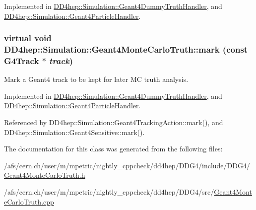 Implemented in \hyperlink{class_d_d4hep_1_1_simulation_1_1_geant4_dummy_truth_handler_aa5a1b21c7557cd4dfb314b217fc37a87}{DD4hep::Simulation::Geant4DummyTruthHandler}, and \hyperlink{class_d_d4hep_1_1_simulation_1_1_geant4_particle_handler_a3ad0a4c70220326e76da4dd79c95501c}{DD4hep::Simulation::Geant4ParticleHandler}.\hypertarget{class_d_d4hep_1_1_simulation_1_1_geant4_monte_carlo_truth_ad74253c38fb6e00003b591a07e5e748d}{
\subsubsection[{mark}]{\setlength{\rightskip}{0pt plus 5cm}virtual void DD4hep::Simulation::Geant4MonteCarloTruth::mark (const G4Track $\ast$ {\em track})}}
\label{class_d_d4hep_1_1_simulation_1_1_geant4_monte_carlo_truth_ad74253c38fb6e00003b591a07e5e748d}


Mark a Geant4 track to be kept for later MC truth analysis. 

Implemented in \hyperlink{class_d_d4hep_1_1_simulation_1_1_geant4_dummy_truth_handler_ae7540d20113834f5a31134df344813ad}{DD4hep::Simulation::Geant4DummyTruthHandler}, and \hyperlink{class_d_d4hep_1_1_simulation_1_1_geant4_particle_handler_a50e23a41d610fd19644a8393da13305b}{DD4hep::Simulation::Geant4ParticleHandler}.

Referenced by DD4hep::Simulation::Geant4TrackingAction::mark(), and DD4hep::Simulation::Geant4Sensitive::mark().

The documentation for this class was generated from the following files:\begin{DoxyCompactItemize}
\item 
/afs/cern.ch/user/m/mpetric/nightly\_\-cppcheck/dd4hep/DDG4/include/DDG4/\hyperlink{_geant4_monte_carlo_truth_8h}{Geant4MonteCarloTruth.h}\item 
/afs/cern.ch/user/m/mpetric/nightly\_\-cppcheck/dd4hep/DDG4/src/\hyperlink{_geant4_monte_carlo_truth_8cpp}{Geant4MonteCarloTruth.cpp}\end{DoxyCompactItemize}
